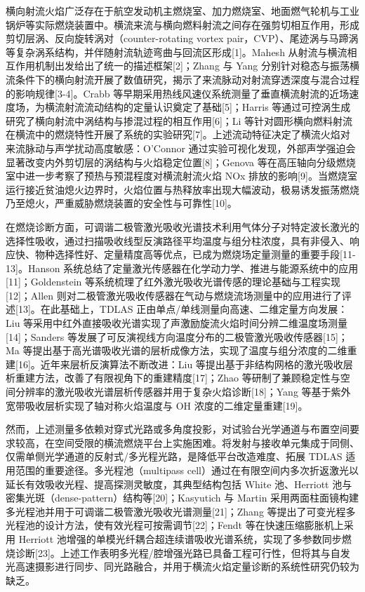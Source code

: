 \documentclass[UTF8,a4paper,zihao=-4,fontset=windows]{ctexart}
\begin{document}
横向射流火焰广泛存在于航空发动机主燃烧室、加力燃烧室、地面燃气轮机与工业锅炉等实际燃烧装置中。横流来流与横向燃料射流之间存在强剪切相互作用，形成剪切层涡、反向旋转涡对（counter-rotating vortex pair，CVP）、尾迹涡与马蹄涡等复杂涡系结构，并伴随射流轨迹弯曲与回流区形成[1]。Mahesh 从射流与横流相互作用机制出发给出了统一的描述框架[2]；Zhang 与 Yang 分别针对稳态与振荡横流条件下的横向射流开展了数值研究，揭示了来流脉动对射流穿透深度与混合过程的影响规律[3-4]。Crabb 等早期采用热线风速仪系统测量了垂直横流射流的近场速度场，为横流射流流动结构的定量认识奠定了基础[5]；Harris 等通过可控涡生成研究了横向射流中涡结构与掺混过程的相互作用[6]；Li 等针对圆形横向燃料射流在横流中的燃烧特性开展了系统的实验研究[7]。上述流动特征决定了横流火焰对来流脉动与声学扰动高度敏感：O'Connor 通过实验可视化发现，外部声学强迫会显著改变内外剪切层的涡结构与火焰稳定位置[8]；Genova 等在高压轴向分级燃烧室中进一步考察了预热与预混程度对横流射流火焰 NOx 排放的影响[9]。当燃烧室运行接近贫油熄火边界时，火焰位置与热释放率出现大幅波动，极易诱发振荡燃烧乃至熄火，严重威胁燃烧装置的安全性与可靠性[10]。

在燃烧诊断方面，可调谐二极管激光吸收光谱技术利用气体分子对特定波长激光的选择性吸收，通过扫描吸收线型反演路径平均温度与组分柱浓度，具有非侵入、响应快、物种选择性好、定量精度高等优点，已成为燃烧场定量测量的重要手段[11-13]。Hanson 系统总结了定量激光传感器在化学动力学、推进与能源系统中的应用[11]；Goldenstein 等系统梳理了红外激光吸收光谱传感的理论基础与工程实现[12]；Allen 则对二极管激光吸收传感器在气动与燃烧流场测量中的应用进行了评述[13]。在此基础上，TDLAS 正由单点/单线测量向高速、二维定量方向发展：Liu 等采用中红外直接吸收光谱实现了声激励旋流火焰时间分辨二维温度场测量[14]；Sanders 等发展了可反演视线方向温度分布的二极管激光吸收传感器[15]；Ma 等提出基于高光谱吸收光谱的层析成像方法，实现了温度与组分浓度的二维重建[16]。近年来层析反演算法不断改进：Liu 等提出基于非结构网格的激光吸收层析重建方法，改善了有限视角下的重建精度[17]；Zhao 等研制了兼顾稳定性与空间分辨率的激光吸收光谱层析传感器并用于复杂火焰诊断[18]；Yang 等基于紫外宽带吸收层析实现了轴对称火焰温度与 OH 浓度的二维定量重建[19]。

然而，上述测量多依赖对穿式光路或多角度投影，对试验台光学通道与布置空间要求较高，在空间受限的横流燃烧平台上实施困难。将发射与接收单元集成于同侧、仅需单侧光学通道的反射式/多光程光路，是降低平台改造难度、拓展 TDLAS 适用范围的重要途径。多光程池（multipass cell）通过在有限空间内多次折返激光以延长有效吸收光程、提高探测灵敏度，其典型结构包括 White 池、Herriott 池与密集光斑（dense-pattern）结构等[20]；Kasyutich 与 Martin 采用两面柱面镜构建多光程池并用于可调谐二极管激光吸收光谱测量[21]；Zhang 等提出了可变光程多光程池的设计方法，使有效光程可按需调节[22]；Fendt 等在快速压缩膨胀机上采用 Herriott 池增强的单模光纤耦合超连续谱吸收光谱系统，实现了多参数同步燃烧诊断[23]。上述工作表明多光程/腔增强光路已具备工程可行性，但将其与自发光高速摄影进行同步、同光路融合，并用于横流火焰定量诊断的系统性研究仍较为缺乏。
\end{document}
